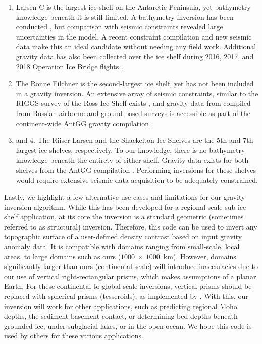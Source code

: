 \begin{enumerate}
    \item Larsen C is the largest ice shelf on the Antarctic Peninsula, yet bathymetry knowledge beneath it is still limited. A bathymetry inversion has been conducted \citep{cochraninversion2012}, but comparison with seismic constraints revealed large uncertainties in the model. A recent constraint compilation and new seismic data \citep{brisbourneupdated2020} make this an ideal candidate without needing any field work. Additional gravity data has also been collected over the ice shelf during 2016, 2017, and 2018 Operation Ice Bridge flights \citep{icebridge2020}. 
    \item The Ronne Filchner is the second-largest ice shelf, yet has not been included in a gravity inversion. An extensive array of seismic constraints, similar to the RIGGS survey of the Ross Ice Shelf exists \citep{rosiernew2018, fretwellbedmap22013}, and gravity data from compiled from Russian airborne and ground-based surveys \citep{aleshkovagravity2000, studingercrustal1999} is accessible as part of the continent-wide AntGG gravity compilation \citep{scheinertnew2016}. 
    \item and 4. The Riiser-Larsen and the Shackelton Ice Shelves are the 5th and 7th largest ice shelves, respectively. To our knowledge, there is no bathymetry knowledge beneath the entirety of either shelf. Gravity data exists for both shelves from the AntGG compilation \citep{scheinertnew2016}. Performing inversions for these shelves would require extensive seismic data acquisition to be adequately constrained.
\end{enumerate}

Lastly, we highlight a few alternative use cases and limitations for our gravity inversion algorithm. While this has been developed for a regional-scale sub-ice shelf application, at its core the inversion is a standard geometric (sometimes referred to as structural) inversion. Therefore, this code can be used to invert any topographic surface of a user-defined density contrast based on input gravity anomaly data. It is compatible with domains ranging from small-scale, local areas, to large domains such as ours ($1000~\times~1000$~km). However, domains significantly larger than ours (continental scale) will introduce inaccuracies due to our use of vertical right-rectangular prisms, which makes assumptions of a planar Earth. For these continental to global scale inversions, vertical prisms should be replaced with spherical prisms (tesseroids), as implemented by \citep{uiedafast2017}. With this, our inversion will work for other applications, such as predicting regional Moho depths, the sediment-basement contact, or determining bed depths beneath grounded ice, under subglacial lakes, or in the open ocean. We hope this code is used by others for these various applications.

